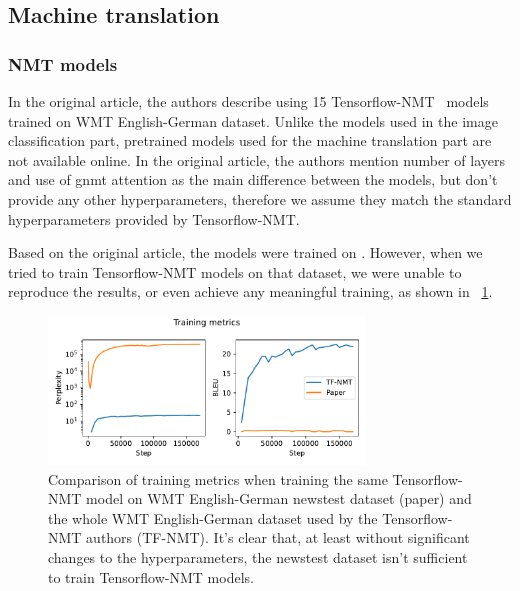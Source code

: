 \begin{figure}
\end{figure}

\subsection{Machine translation}

\subsubsection{NMT models} %

In the original article, the authors describe using 15 Tensorflow-NMT~\cite{luong17} models trained on WMT English-German dataset. Unlike the models used in the image classification part, pretrained models used for the machine translation part are not available online. In the original article, the authors mention number of layers and use of gnmt attention as the main difference between the models, but don't provide any other hyperparameters, therefore we assume they match the standard hyperparameters provided by Tensorflow-NMT.

Based on the original article, the models were trained on . However, when we tried to train Tensorflow-NMT models on that dataset, we were unable to reproduce the results, or even achieve any meaningful training, as shown in \figurename~\ref{fig:tf-nmt_paper_training}.

\begin{figure}[h]
  \centering
  \includegraphics[width=0.75\textwidth]{figures/tf-nmt_paper_training.pdf}
  \caption{Comparison of training metrics when training the same Tensorflow-NMT model on WMT English-German newstest dataset (paper) and the whole WMT English-German dataset used by the Tensorflow-NMT authors (TF-NMT). It's clear that, at least without significant changes to the hyperparameters, the newstest dataset isn't sufficient to train Tensorflow-NMT models.}
  \label{fig:tf-nmt_paper_training}
\end{figure}

